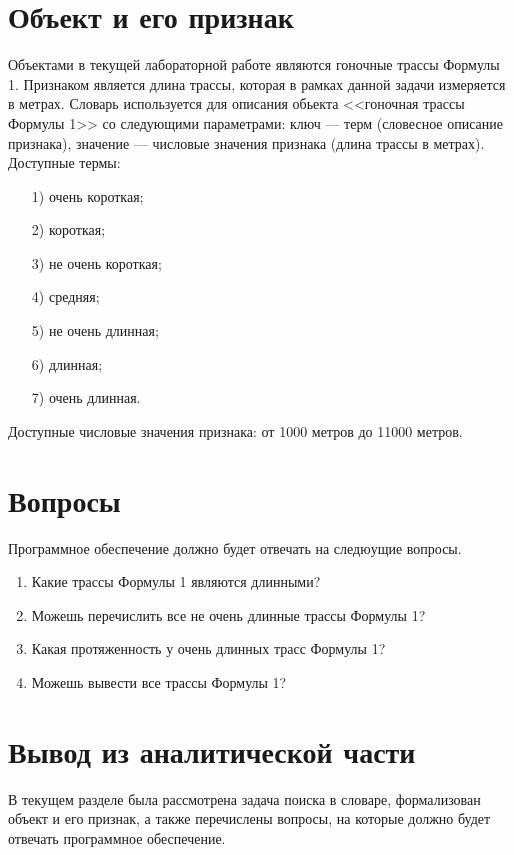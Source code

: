 \section{Объект и его признак}

Объектами в текущей лабораторной работе являются гоночные трассы Формулы 1. 
Признаком является длина трассы, которая в рамках данной задачи измеряется в метрах. 
Словарь используется для описания обьекта <<гоночная трассы Формулы 1>> со следующими параметрами: ключ --- терм (словесное описание признака), значение --- числовые значения признака (длина трассы в метрах). 
Доступные термы:
\begin{enumerate}
\item[1)] очень короткая;
\item[2)] короткая;
\item[3)] не очень короткая;
\item[4)] средняя;
\item[5)] не очень длинная;
\item[6)] длинная;
\item[7)] очень длинная.
\end{enumerate}

Доступные числовые значения признака: от 1000 метров до 11000 метров.

\section{Вопросы}

Программное обеспечение должно будет отвечать на следюущие вопросы.
\begin{enumerate}
\item Какие трассы Формулы 1 являются длинными?
\item Можешь перечислить все не очень длинные трассы Формулы 1?
\item Какая протяженность у очень длинных трасс Формулы 1?
\item Можешь вывести все трассы Формулы 1?
\end{enumerate}

\section*{Вывод из аналитической части}

В текущем разделе была рассмотрена задача поиска в словаре, формализован объект и его признак, а также перечислены вопросы, на которые должно будет отвечать программное обеспечение. 
